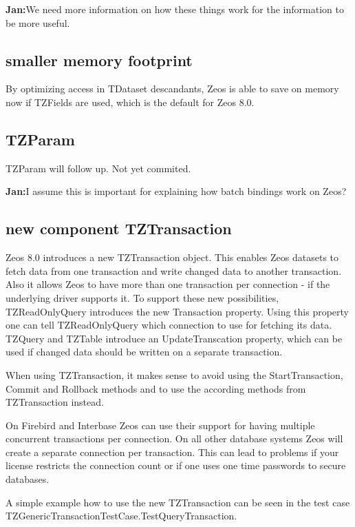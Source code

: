 \documentclass[a4paper,12pt,oneside]{article}
\begin{document}
\textbf{Jan:}We need more information on how these things work for the information to be more useful.

\subsection{smaller memory footprint}
By optimizing access in TDataset descandants, Zeos is able to save on memory now if TZFields are used, which is the default for Zeos 8.0.

\subsection{TZParam}

TZParam will follow up. 
Not yet commited.

\textbf{Jan:}I assume this is important for explaining how batch bindings work on Zeos?

\subsection{new component TZTransaction}

Zeos 8.0 introduces a new TZTransaction object.
This enables Zeos datasets to fetch data from one transaction and write changed data to another transaction.
Also it allows Zeos to have more than one transaction per connection - if the underlying driver supports it.
To support these new possibilities, TZReadOnlyQuery introduces the new Transaction property.
Using this property one can tell TZReadOnlyQuery which connection to use for fetching its data.
TZQuery and TZTable introduce an UpdateTranscation property, which can be used if changed data should be written on a separate transaction.

When using TZTransaction, it makes sense to avoid using the StartTransaction, Commit and Rollback methods and to use the according methods from TZTransaction instead.

On Firebird and Interbase Zeos can use their support for having multiple concurrent transactions per connection.
On all other database systems Zeos will create a separate connection per transaction.
This can lead to problems if your license restricts the connection count or if one uses one time passwords to secure databases.

A simple example how to use the new TZTransaction can be seen in the test case TZGenericTransactionTestCase.TestQueryTransaction.

\end{document}
